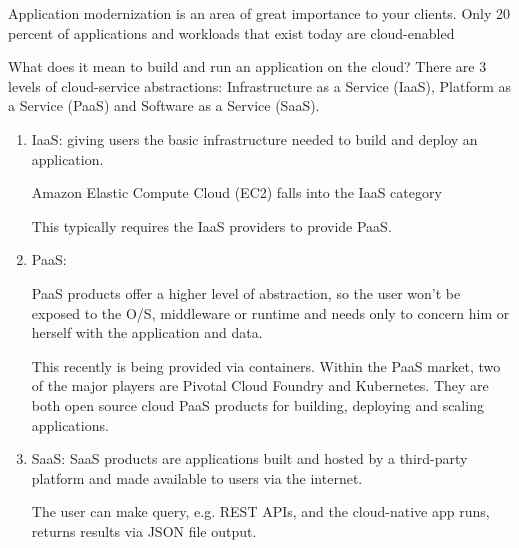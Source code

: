 Application modernization is an area of great importance to your clients. Only
20 percent of applications and workloads that exist today are cloud-enabled


What does it mean to build and run an application on the cloud? There are 3
levels of cloud-service abstractions: Infrastructure as a Service (IaaS),
Platform as a Service (PaaS) and Software as a Service (SaaS).
 
\begin{enumerate}
  \item IaaS:
  giving users the basic infrastructure needed to build and deploy an application.
  
   Amazon Elastic Compute Cloud (EC2) falls into the IaaS category
   
   This typically requires the IaaS providers to provide PaaS.
  
  \item PaaS: 
  
  PaaS products offer a higher level of abstraction, so the user won’t be
  exposed to the O/S, middleware or runtime and needs only to concern him or
  herself with the application and data.
  
  This recently is being provided via containers.
  Within the PaaS market, two of the major players are Pivotal Cloud Foundry and
  Kubernetes. They are both open source cloud PaaS products for building,
  deploying and scaling applications.
  
  
  \item SaaS:
  SaaS products are applications built and hosted by a third-party platform and
  made available to users via the internet.
  
  The user can make query, e.g. REST APIs, and the cloud-native app runs,
  returns results via JSON file output.
  
  
  
\end{enumerate}
 
 